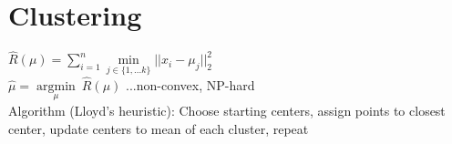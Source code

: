 \section*{Clustering}
$\hat{R}(\mu) = \sum_{i=1}^n \underset{j\in\{1,...k\}}{\operatorname{min}}||x_i-\mu_j||_2^2$\\
$\hat{\mu} =  \underset{\mu}{\operatorname{argmin}} ~ \hat{R}(\mu)$ ...non-convex, NP-hard \\
Algorithm (Lloyd's heuristic): Choose starting centers, assign points to closest center, update centers to mean of each cluster, repeat

